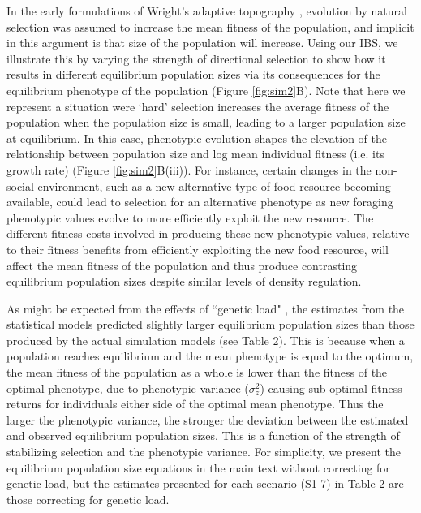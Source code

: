 \documentclass{article}
\begin{document}
	In the early formulations of Wright's adaptive topography \citep{Wright1931}, evolution by natural selection was assumed to increase the mean fitness of the population, and implicit in this argument is that size of the population will increase. Using our IBS, we illustrate this by varying the strength of directional selection to show how it results in different equilibrium population sizes via its consequences for the equilibrium phenotype of the population (Figure \ref{fig:sim2}B). Note that here we represent a situation were `hard' selection increases the average fitness of the population when the population size is small, leading to a larger population size at equilibrium. In this case, phenotypic evolution shapes the elevation of the relationship between population size and log mean individual fitness (i.e. its growth rate) (Figure \ref{fig:sim2}B(iii)). For instance, certain changes in the non-social environment, such as a new alternative type of food resource becoming available, could lead to selection for an alternative phenotype as new foraging phenotypic values evolve to more efficiently exploit the new resource. The different fitness costs involved in producing these new phenotypic values, relative to their fitness benefits from efficiently exploiting the new food resource, will affect the mean fitness of the population and thus produce contrasting equilibrium population sizes despite similar levels of density regulation.
	
	As might be expected from the effects of “genetic load" \citep{Lande1996}, the estimates from the statistical models predicted slightly larger equilibrium population sizes than those produced by the actual simulation models  (see Table 2). This is because when a population reaches equilibrium and the mean phenotype is equal to the optimum, the mean fitness of the population as a whole is lower than the fitness of the optimal phenotype, due to phenotypic variance ($\sigma^2_z$) causing sub-optimal fitness returns for individuals either side of the optimal mean phenotype. Thus the larger the phenotypic variance, the stronger the deviation between the estimated and observed equilibrium population sizes. This is a function of the strength of stabilizing selection and the phenotypic variance. For simplicity, we present the equilibrium population size equations in the main text without correcting for genetic load, but the estimates presented for each scenario (S1-7) in Table 2 are those correcting for genetic load.  
	
\end{document}
